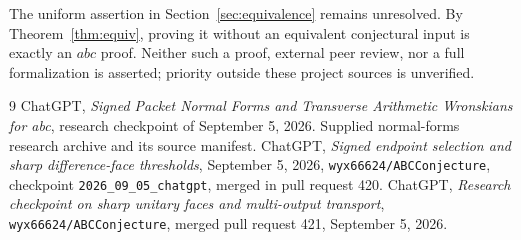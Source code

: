 \documentclass[11pt]{article}
\theoremstyle{definition}
\theoremstyle{remark}
\begin{document}
The uniform assertion in Section~\ref{sec:equivalence} remains unresolved. By Theorem~\ref{thm:equiv}, proving it without an equivalent conjectural input is exactly an $abc$ proof. Neither such a proof, external peer review, nor a full formalization is asserted; priority outside these project sources is unverified.

\begin{thebibliography}{9}
\small
\setlength{\itemsep}{0pt}
 ChatGPT, \emph{Signed Packet Normal Forms and Transverse Arithmetic Wronskians for abc}, research checkpoint of September 5, 2026. Supplied normal-forms research archive and its source manifest.
 ChatGPT, \emph{Signed endpoint selection and sharp difference-face thresholds}, September 5, 2026, \texttt{wyx66624/ABCConjecture}, checkpoint \texttt{2026\_09\_05\_chatgpt}, merged in pull request 420.
 ChatGPT, \emph{Research checkpoint on sharp unitary faces and multi-output transport}, \texttt{wyx66624/ABCConjecture}, merged pull request 421, September 5, 2026.
\end{thebibliography}
\end{document}
